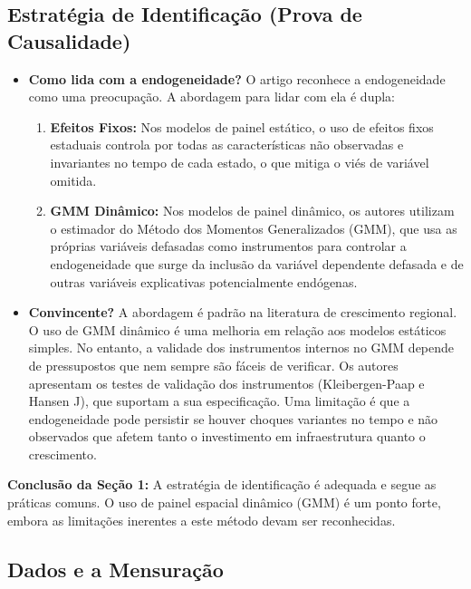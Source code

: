 \documentclass[12pt, a4paper]{article}
\begin{document}
\subsection{Estratégia de Identificação (Prova de Causalidade)}

\begin{itemize}
    \item \textbf{Como lida com a endogeneidade?} O artigo reconhece a endogeneidade como uma preocupação. A abordagem para lidar com ela é dupla:
        \begin{enumerate}
            \item \textbf{Efeitos Fixos:} Nos modelos de painel estático, o uso de efeitos fixos estaduais controla por todas as características não observadas e invariantes no tempo de cada estado, o que mitiga o viés de variável omitida.
            \item \textbf{GMM Dinâmico:} Nos modelos de painel dinâmico, os autores utilizam o estimador do Método dos Momentos Generalizados (GMM), que usa as próprias variáveis defasadas como instrumentos para controlar a endogeneidade que surge da inclusão da variável dependente defasada e de outras variáveis explicativas potencialmente endógenas.
        \end{enumerate}

    \item \textbf{Convincente?} A abordagem é padrão na literatura de crescimento regional. O uso de GMM dinâmico é uma melhoria em relação aos modelos estáticos simples. No entanto, a validade dos instrumentos internos no GMM depende de pressupostos que nem sempre são fáceis de verificar. Os autores apresentam os testes de validação dos instrumentos (Kleibergen-Paap e Hansen J), que suportam a sua especificação. Uma limitação é que a endogeneidade pode persistir se houver choques variantes no tempo e não observados que afetem tanto o investimento em infraestrutura quanto o crescimento.
\end{itemize}

\noindent\textbf{Conclusão da Seção 1:} A estratégia de identificação é adequada e segue as práticas comuns. O uso de painel espacial dinâmico (GMM) é um ponto forte, embora as limitações inerentes a este método devam ser reconhecidas.

\subsection{Dados e a Mensuração}
\end{document}
